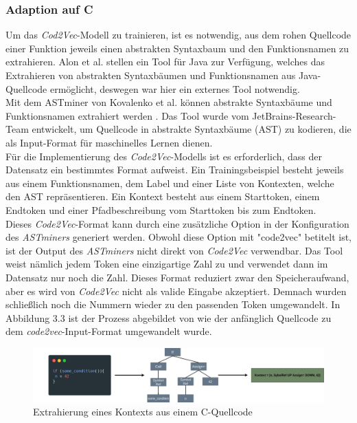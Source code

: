 \documentclass[12pt,letterpaper,ngerman]{article}
\begin{document}
\subsubsection{Adaption auf C}
Um das \textit{Cod2Vec}-Modell zu trainieren, ist es notwendig,
aus dem rohen Quellcode einer Funktion jeweils einen abstrakten 
Syntaxbaum und den
Funktionsnamen zu extrahieren. Alon et al. stellen ein Tool 
für Java zur Verfügung, welches das Extrahieren von abstrakten 
Syntaxbäumen und Funktionsnamen aus Java-Quellcode ermöglicht, 
deswegen war hier ein externes Tool notwendig.\\
Mit dem ASTminer von Kovalenko et al. können abstrakte Syntaxbäume
und Funktionsnamen extrahiert werden \cite{kovalenko2019pathminer}. 
Das Tool wurde vom JetBrains-Research-Team entwickelt, um Quellcode
in abstrakte Syntaxbäume (AST) zu 
kodieren, die als Input-Format für maschinelles Lernen dienen.\\ 
Für die Implementierung des \textit{Code2Vec}-Modells ist es 
erforderlich, dass der Datensatz ein bestimmtes Format aufweist.
Ein Trainingsbeispiel besteht jeweils aus einem 
Funktionsnamen, dem Label und einer Liste von Kontexten, welche den AST 
repräsentieren. Ein Kontext besteht aus einem Starttoken, einem Endtoken 
und einer Pfadbeschreibung vom Starttoken bis zum Endtoken.\\
Dieses \textit{Code2Vec}-Format kann durch eine zusätzliche Option
in der Konfiguration des \textit{ASTminers} generiert werden.
Obwohl diese Option mit "code2vec" betitelt ist, ist der Output des
\textit{ASTminers} nicht direkt von \textit{Code2Vec} verwendbar.
Das Tool weist nämlich jedem Token eine
einzigartige Zahl zu und verwendet dann im Datensatz nur noch die Zahl.
Dieses Format reduziert zwar den Speicheraufwand, aber es wird von 
\textit{Code2Vec} nicht als valide Eingabe akzeptiert. Demnach
wurden schließlich noch die Nummern wieder zu den passenden
Token umgewandelt. In Abbildung 3.3 ist der Prozess abgebildet 
von wie der anfänglich Quellcode zu dem 
\textit{code2vec}-Input-Format
umgewandelt wurde.
\begin{figure}
  \begin{center}
    \includegraphics[scale=0.2]{abb/ast-extraction-example.drawio.png}
  \end{center}
  \caption{Extrahierung eines Kontexts aus einem C-Quellcode}
\end{figure}
\end{document}
